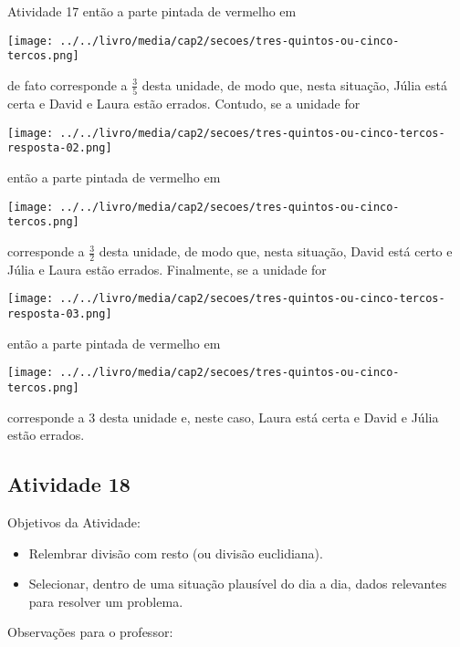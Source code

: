 \documentclass[oneside]{book}
\begin{document}
\begin{multicols}{2}
\begin{resposta*}{Atividade 17}
  então a parte pintada de vermelho em

    \texttt{[image: ../../livro/media/cap2/secoes/tres-quintos-ou-cinco-tercos.png]}

  de fato corresponde a   $\frac{3}{5}$   desta unidade, de modo que, nesta situação, Júlia está certa e David e Laura estão errados. Contudo, se a unidade for

    \texttt{[image: ../../livro/media/cap2/secoes/tres-quintos-ou-cinco-tercos-resposta-02.png]}

  então a parte pintada de vermelho em

    \texttt{[image: ../../livro/media/cap2/secoes/tres-quintos-ou-cinco-tercos.png]}

  corresponde a   $\frac{3}{2}$   desta unidade,  de modo que, nesta situação, David está certo e Júlia e Laura estão errados. Finalmente, se a unidade for

    \texttt{[image: ../../livro/media/cap2/secoes/tres-quintos-ou-cinco-tercos-resposta-03.png]}

  então a parte pintada de vermelho em

    \texttt{[image: ../../livro/media/cap2/secoes/tres-quintos-ou-cinco-tercos.png]}

  corresponde a   $3$   desta unidade e, neste caso, Laura está certa e David e Júlia estão errados.
\end{resposta*}




\subsection{Atividade 18}



  Objetivos da Atividade:

\begin{itemize} %
    \item       Relembrar divisão com resto (ou divisão euclidiana).
    \item       Selecionar, dentro de uma situação plausível do dia a dia, dados relevantes para resolver um problema.
\end{itemize} %



  Observações para o professor:


\end{multicols}
\end{document}
